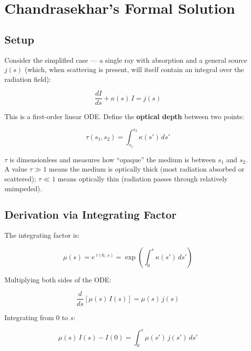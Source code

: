 \documentclass[11pt]{article}
\begin{document}
\section{Chandrasekhar's Formal Solution}

\subsection{Setup}

Consider the simplified case --- a single ray with absorption and a general source $j(s)$
(which, when scattering is present, will itself contain an integral over the radiation field):

\begin{equation}
\frac{dI}{ds} + \kappa(s)\, I = j(s)
\end{equation}

This is a first-order linear ODE. Define the \textbf{optical depth} between two points:

\begin{equation}
\tau(s_1, s_2) = \int_{s_1}^{s_2} \kappa(s')\, ds'
\end{equation}

$\tau$ is dimensionless and measures how ``opaque'' the medium is between $s_1$ and $s_2$.
A value $\tau \gg 1$ means the medium is optically thick (most radiation absorbed or scattered);
$\tau \ll 1$ means optically thin (radiation passes through relatively unimpeded).

\subsection{Derivation via Integrating Factor}

The integrating factor is:

\begin{equation}
\mu(s) = e^{\,\tau(0,\,s)} = \exp\!\left(\int_0^s \kappa(s')\, ds'\right)
\end{equation}

Multiplying both sides of the ODE:

\begin{equation}
\frac{d}{ds}\!\left[\mu(s)\, I(s)\right] = \mu(s)\, j(s)
\end{equation}

Integrating from $0$ to $s$:

\begin{equation}
\mu(s)\, I(s) - I(0) = \int_0^s \mu(s')\, j(s')\, ds'
\end{equation}
\end{document}
